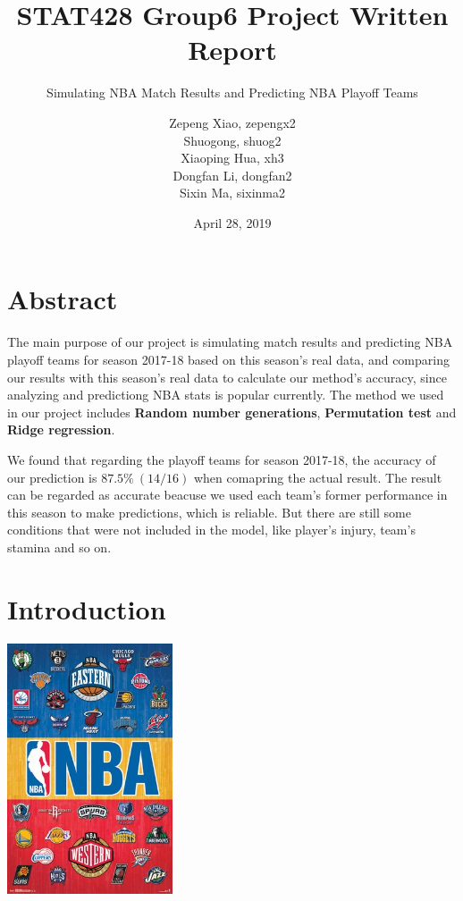 \documentclass[]{article}
\title{\vspace{7cm} \LARGE{STAT428 Group6 Project Written Report}}
\subtitle{Simulating NBA Match Results and Predicting NBA Playoff Teams}
\author{Zepeng Xiao, zepengx2 \\ Shuogong, shuog2 \\ Xiaoping Hua, xh3 \\ Dongfan Li, dongfan2 \\ Sixin Ma, sixinma2}
\date{April 28, 2019}
\begin{document}
\maketitle

\pagebreak

\hypertarget{abstract}{%
\section{Abstract}\label{abstract}}

The main purpose of our project is simulating match results and
predicting NBA playoff teams for season 2017-18 based on this season's
real data, and comparing our results with this season's real data to
calculate our method's accuracy, since analyzing and predictiong NBA
stats is popular currently. The method we used in our project includes
\textbf{Random number generations}, \textbf{Permutation test} and
\textbf{Ridge regression}.

We found that regarding the playoff teams for season 2017-18, the
accuracy of our prediction is \(87.5 \% \ (14/16)\) when comapring the
actual result. The result can be regarded as accurate beacuse we used
each team's former performance in this season to make predictions, which
is reliable. But there are still some conditions that were not included
in the model, like player's injury, team's stamina and so on.

\hypertarget{introduction}{%
\section{Introduction}\label{introduction}}

\begin{center}\includegraphics[height=280px]{eastandwest} \end{center}
\end{document}
